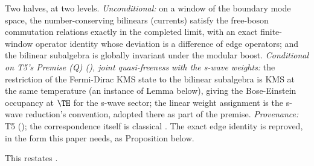 Two halves, at two levels. \emph{Unconditional:} on a window of the boundary mode space, the number-conserving bilinears (currents) satisfy the free-boson commutation relations exactly in the completed limit, with an exact finite-window operator identity whose deviation is a difference of edge operators; and the bilinear subalgebra is globally invariant under the modular boost. \emph{Conditional on T5's Premise (Q) (), joint quasi-freeness with the s-wave weights:} the restriction of the Fermi-Dirac KMS state to the bilinear subalgebra is KMS at the same temperature (an instance of Lemma  below), giving the Bose-Einstein occupancy at $\TH$ for the s-wave sector; the linear weight assignment is the s-wave reduction's convention, adopted there as part of the premise. \emph{Provenance:} T5 \cite[Prem.~8.1, Thm.~8.2]{ButlerT5} (); the correspondence itself is classical \cite{FrenkelKac1980}. The exact edge identity is reproved, in the form this paper needs, as Proposition  below.

This restates .
